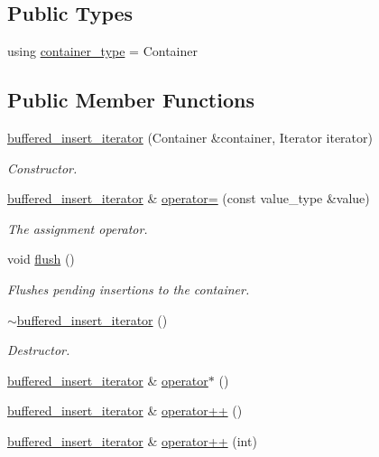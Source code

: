\subsection*{Public Types}
\begin{DoxyCompactItemize}
\item 
using \hyperlink{classshad_1_1buffered__insert__iterator_a8d1e5c22ad001becf13b9d0f452eecf2}{container\-\_\-type} = Container
\end{DoxyCompactItemize}
\subsection*{Public Member Functions}
\begin{DoxyCompactItemize}
\item 
\hyperlink{classshad_1_1buffered__insert__iterator_a30c2613f13dc91cfb3f1b37099dc00c5}{buffered\-\_\-insert\-\_\-iterator} (Container \&container, Iterator iterator)
\begin{DoxyCompactList}\small\item\em Constructor. \end{DoxyCompactList}\item 
\hyperlink{classshad_1_1buffered__insert__iterator}{buffered\-\_\-insert\-\_\-iterator} \& \hyperlink{classshad_1_1buffered__insert__iterator_ae52408e8adbe5dfd80c6347a3b93d017}{operator=} (const value\-\_\-type \&value)
\begin{DoxyCompactList}\small\item\em The assignment operator. \end{DoxyCompactList}\item 
void \hyperlink{classshad_1_1buffered__insert__iterator_aadf229f6aac3dbdfc204b7f6309b2e71}{flush} ()
\begin{DoxyCompactList}\small\item\em Flushes pending insertions to the container. \end{DoxyCompactList}\item 
\hyperlink{classshad_1_1buffered__insert__iterator_ae375c7de831143a927f581b441aa987d}{$\sim$buffered\-\_\-insert\-\_\-iterator} ()
\begin{DoxyCompactList}\small\item\em Destructor. \end{DoxyCompactList}\item 
\hyperlink{classshad_1_1buffered__insert__iterator}{buffered\-\_\-insert\-\_\-iterator} \& \hyperlink{classshad_1_1buffered__insert__iterator_a329d91c1c95a1d86fe9b3cd14032bc23}{operator$\ast$} ()
\item 
\hyperlink{classshad_1_1buffered__insert__iterator}{buffered\-\_\-insert\-\_\-iterator} \& \hyperlink{classshad_1_1buffered__insert__iterator_a270b0bd4c6bfaa0cf656c4e65c676bef}{operator++} ()
\item 
\hyperlink{classshad_1_1buffered__insert__iterator}{buffered\-\_\-insert\-\_\-iterator} \& \hyperlink{classshad_1_1buffered__insert__iterator_a326909f8fb18bdb6ae9744e3b4a189f7}{operator++} (int)
\end{DoxyCompactItemize}
